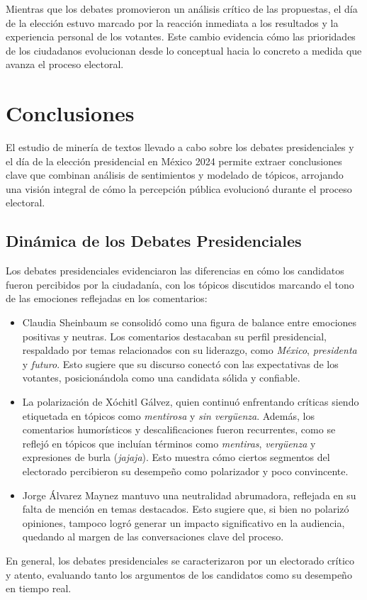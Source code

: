 \documentclass[10pt, a4paper]{article}
\begin{document}
	Mientras que los debates promovieron un análisis crítico de las propuestas, el día de la elección estuvo marcado por la reacción inmediata a los resultados y la experiencia personal de los votantes. Este cambio evidencia cómo las prioridades de los ciudadanos evolucionan desde lo conceptual hacia lo concreto a medida que avanza el proceso electoral.
	
		
	\section{Conclusiones}
	
	El estudio de minería de textos llevado a cabo sobre los debates presidenciales y el día de la elección presidencial en México 2024 permite extraer conclusiones clave que combinan análisis de sentimientos y modelado de tópicos, arrojando una visión integral de cómo la percepción pública evolucionó durante el proceso electoral.
	
	\subsection{Dinámica de los Debates Presidenciales}
	Los debates presidenciales evidenciaron las diferencias en cómo los candidatos fueron percibidos por la ciudadanía, con los tópicos discutidos marcando el tono de las emociones reflejadas en los comentarios:
	\begin{itemize}
		\item Claudia Sheinbaum se consolidó como una figura de balance entre emociones positivas y neutras. Los comentarios destacaban su perfil presidencial, respaldado por temas relacionados con su liderazgo, como \textit{México}, \textit{presidenta} y \textit{futuro}. Esto sugiere que su discurso conectó con las expectativas de los votantes, posicionándola como una candidata sólida y confiable.
		\item La polarización de Xóchitl Gálvez, quien continuó enfrentando críticas siendo etiquetada en tópicos como \textit{mentirosa} y \textit{sin vergüenza}. Además, los comentarios humorísticos y descalificaciones fueron recurrentes, como se reflejó en tópicos que incluían términos como \textit{mentiras}, \textit{vergüenza} y expresiones de burla (\textit{jajaja}). Esto muestra cómo ciertos segmentos del electorado percibieron su desempeño como polarizador y poco convincente.
		\item Jorge Álvarez Maynez mantuvo una neutralidad abrumadora, reflejada en su falta de mención en temas destacados. Esto sugiere que, si bien no polarizó opiniones, tampoco logró generar un impacto significativo en la audiencia, quedando al margen de las conversaciones clave del proceso.
	\end{itemize}
	En general, los debates presidenciales se caracterizaron por un electorado crítico y atento, evaluando tanto los argumentos de los candidatos como su desempeño en tiempo real.
	
\end{document}
